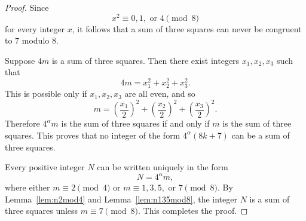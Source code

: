 \begin{proof}
\leanok
Since
\[
x^{2} \equiv 0,1,\text{ or }4 \pmod 8
\]
for every integer $x$, it follows that a sum of three squares can never be
congruent to $7$ modulo $8$.

Suppose $4m$ is a sum of three squares.  Then there exist integers $x_1,x_2,x_3$
such that
\[
4m = x_1^{2} + x_2^{2} + x_3^{2}.
\]
This is possible only if $x_1,x_2,x_3$ are all even, and so
\[
m = \left(\frac{x_1}{2}\right)^{2}
  + \left(\frac{x_2}{2}\right)^{2}
  + \left(\frac{x_3}{2}\right)^{2}.
\]
Therefore $4^{\alpha}m$ is the sum of three squares if and only if $m$ is the
sum of three squares.  This proves that no integer of the form $4^{\alpha}(8k+7)$
can be a sum of three squares.

Every positive integer $N$ can be written uniquely in the form
\[
N = 4^{\alpha} m,
\]
where either $m\equiv 2 \pmod 4$ or
$m\equiv 1,3,5,$ or $7 \pmod 8$.  By Lemma~\ref{lem:n2mod4} and
Lemma~\ref{lem:n135mod8}, the integer $N$ is a sum of three squares unless
$m\equiv 7 \pmod 8$.  This completes the proof.
\end{proof}




